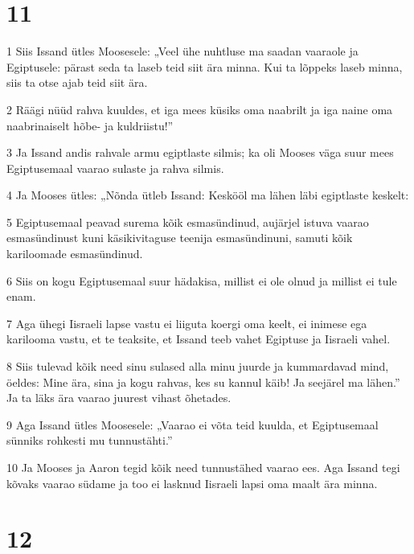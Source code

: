 \chapter{11}

\par 1 Siis Issand ütles Moosesele: „Veel ühe nuhtluse ma saadan vaaraole ja Egiptusele: pärast seda ta laseb teid siit ära minna. Kui ta lõppeks laseb minna, siis ta otse ajab teid siit ära.
\par 2 Räägi nüüd rahva kuuldes, et iga mees küsiks oma naabrilt ja iga naine oma naabrinaiselt hõbe- ja kuldriistu!”
\par 3 Ja Issand andis rahvale armu egiptlaste silmis; ka oli Mooses väga suur mees Egiptusemaal vaarao sulaste ja rahva silmis.
\par 4 Ja Mooses ütles: „Nõnda ütleb Issand: Keskööl ma lähen läbi egiptlaste keskelt:
\par 5 Egiptusemaal peavad surema kõik esmasündinud, aujärjel istuva vaarao esmasündinust kuni käsikivitaguse teenija esmasündinuni, samuti kõik kariloomade esmasündinud.
\par 6 Siis on kogu Egiptusemaal suur hädakisa, millist ei ole olnud ja millist ei tule enam.
\par 7 Aga ühegi Iisraeli lapse vastu ei liiguta koergi oma keelt, ei inimese ega karilooma vastu, et te teaksite, et Issand teeb vahet Egiptuse ja Iisraeli vahel.
\par 8 Siis tulevad kõik need sinu sulased alla minu juurde ja kummardavad mind, öeldes: Mine ära, sina ja kogu rahvas, kes su kannul käib! Ja seejärel ma lähen.” Ja ta läks ära vaarao juurest vihast õhetades.
\par 9 Aga Issand ütles Moosesele: „Vaarao ei võta teid kuulda, et Egiptusemaal sünniks rohkesti mu tunnustähti.”
\par 10 Ja Mooses ja Aaron tegid kõik need tunnustähed vaarao ees. Aga Issand tegi kõvaks vaarao südame ja too ei lasknud Iisraeli lapsi oma maalt ära minna.

\chapter{12}

